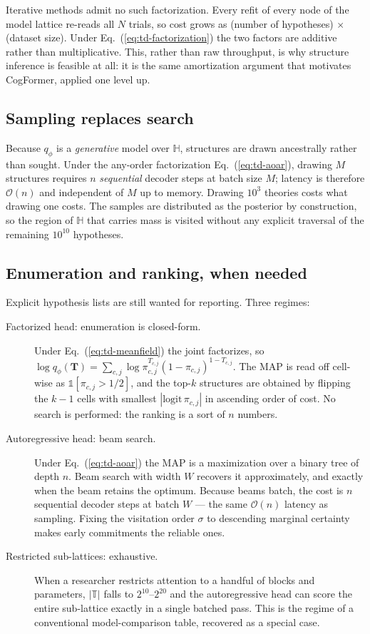 \documentclass[11pt]{article}
\newcommand{\rmT}{\mathbf{T}}
\providecommand{\cref}[1]{Eq.~(\ref{#1})}
\begin{document}
Iterative methods admit no such factorization. Every refit of every node of the model
lattice re-reads all $N$ trials, so cost grows as (number of hypotheses) $\times$
(dataset size). Under \cref{eq:td-factorization} the two factors are additive rather
than multiplicative. This, rather than raw throughput, is why structure inference is
feasible at all: it is the same amortization argument that motivates CogFormer, applied
one level up.

\subsection{Sampling replaces search}

Because $q_\phi$ is a \emph{generative} model over $\mathbb{H}$, structures are drawn
ancestrally rather than sought. Under the any-order factorization
\cref{eq:td-aoar}, drawing $M$ structures requires $n$ \emph{sequential} decoder steps
at batch size $M$; latency is therefore $\mathcal{O}(n)$ and independent of $M$ up to
memory. Drawing $10^3$ theories costs what drawing one costs. The samples are
distributed as the posterior by construction, so the region of $\mathbb{H}$ that carries
mass is visited without any explicit traversal of the remaining $10^{10}$ hypotheses.

\subsection{Enumeration and ranking, when needed}

Explicit hypothesis lists are still wanted for reporting. Three regimes:

\begin{description}
\item[Factorized head: enumeration is closed-form.] Under \cref{eq:td-meanfield} the
joint factorizes, so
$\log q_\phi(\rmT) = \sum_{c,j} \log \pi_{c,j}^{T_{c,j}}(1-\pi_{c,j})^{1-T_{c,j}}$.
The MAP is read off cell-wise as $\mathbb{1}[\pi_{c,j} > 1/2]$, and the top-$k$
structures are obtained by flipping the $k-1$ cells with smallest $|\mathrm{logit}\,\pi_{c,j}|$
in ascending order of cost. No search is performed: the ranking is a sort of $n$ numbers.

\item[Autoregressive head: beam search.] Under \cref{eq:td-aoar} the MAP is a maximization
over a binary tree of depth $n$. Beam search with width $W$ recovers it approximately,
and exactly when the beam retains the optimum. Because beams batch, the cost is $n$
sequential decoder steps at batch $W$ --- the same $\mathcal{O}(n)$ latency as sampling.
Fixing the visitation order $\sigma$ to descending marginal certainty makes early
commitments the reliable ones.

\item[Restricted sub-lattices: exhaustive.] When a researcher restricts attention to a
handful of blocks and parameters, $|\mathbb{T}|$ falls to $2^{10}$--$2^{20}$ and the
autoregressive head can score the entire sub-lattice exactly in a single batched pass.
This is the regime of a conventional model-comparison table, recovered as a special
case.
\end{description}
\end{document}
